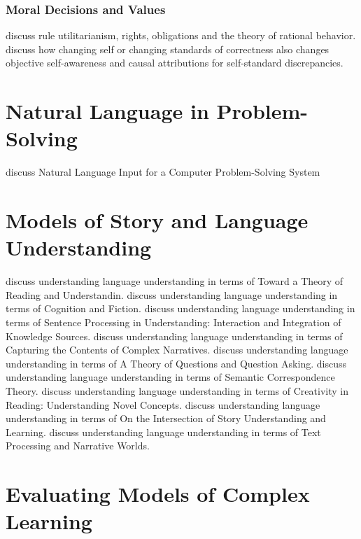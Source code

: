 \subsubsection{Moral Decisions and Values}

\cite{harsanyi1980rur} discuss rule utilitarianism, rights, obligations and the theory of rational behavior.
\cite{duval1999osa} discuss how changing self or changing standards of correctness also changes objective self-awareness and causal attributions for self-standard discrepancies.


\section{Natural Language in Problem-Solving}

\cite{bobrow1968nlicpss} discuss Natural Language Input for a Computer Problem-Solving System



\section{Models of Story and Language Understanding}


\cite{rammoorman1999toru} discuss understanding language understanding in terms of Toward a Theory of Reading and Understandin.
\cite{rapaport1999caf} discuss understanding language understanding in terms of Cognition and Fiction.
\cite{mahesh1999spiu} discuss understanding language understanding in terms of Sentence Processing in Understanding: Interaction and Integration of Knowledge Sources.
\cite{domeshek1999ctccn} discuss understanding language understanding in terms of Capturing the Contents of Complex Narratives.
\cite{ram1999toqqa} discuss understanding language understanding in terms of A Theory of Questions and Question Asking.
\cite{peterson1999sct} discuss understanding language understanding in terms of Semantic Correspondence Theory.
\cite{moorman1999crunc} discuss understanding language understanding in terms of Creativity in Reading: Understanding Novel Concepts.
\cite{coxram1999sual} discuss understanding language understanding in terms of On the Intersection of Story Understanding and Learning.
\cite{gerrig1999tpanw} discuss understanding language understanding in terms of Text Processing and Narrative Worlds.

\section{Evaluating Models of Complex Learning}


